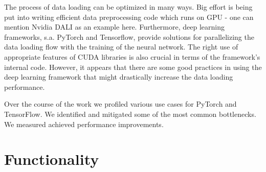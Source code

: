\documentclass[licencjacka,en]{pracamgr}
\begin{document}
The process of data loading can be optimized in many ways. Big effort is being put into writing efficient data preprocessing code which runs on GPU - one can mention Nvidia DALI as an example here. Furthermore, deep learning frameworks, s.a. PyTorch and Tensorflow, provide solutions for parallelizing the data loading flow with the training of the neural network. The right use of appropriate features of CUDA libraries is also crucial in terms of the framework’s internal code. However, it appears that there are some good practices in using the deep learning framework that might drastically increase the data loading performance.

Over the course of the work we profiled various use cases for PyTorch and TensorFlow. We identified and mitigated some of the most common bottlenecks. We measured achieved performance improvements.

\section*{Functionality}

\end{document}
